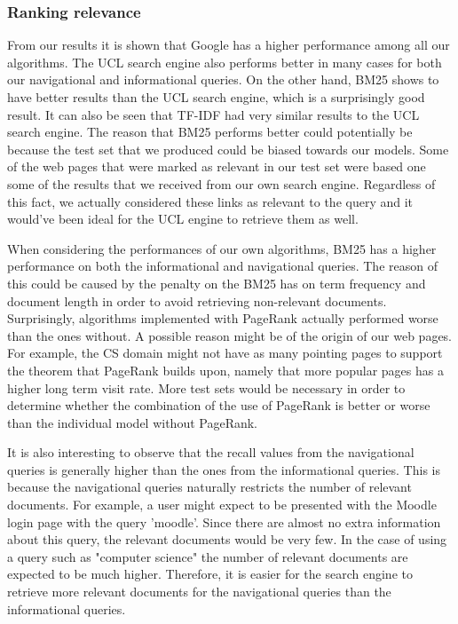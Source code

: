 \subsubsection{Ranking relevance}
From our results it is shown that Google has a higher performance among all our algorithms. The UCL search engine also performs better in many cases for both our navigational and informational queries. On the other hand, BM25 shows to have better results than the UCL search engine, which is a surprisingly good result. It can also be seen that TF-IDF had very similar results to the UCL search engine. The reason that BM25 performs better could potentially be because the test set that we produced could be biased towards our models. Some of the web pages that were marked as relevant in our test set were based one some of the results that we received from our own search engine. Regardless of this fact, we actually considered these links as relevant to the query and it would've been ideal for the UCL engine to retrieve them as well. 

When considering the performances of our own algorithms, BM25 has a higher performance on both the informational and navigational queries. The reason of this could be caused by the penalty on the BM25 has on term frequency and document length in order to avoid retrieving non-relevant documents. Surprisingly, algorithms implemented with PageRank actually performed worse than the ones without. A possible reason might be of the origin of our web pages. For example, the CS domain might not have as many pointing pages to support the theorem that PageRank builds upon, namely that more popular pages has a higher long term visit rate. More test sets would be necessary in order to determine whether the combination of the use of PageRank is better or worse than the individual model without PageRank. 

It is also interesting to observe that the recall values from the navigational queries is generally higher than the ones from the informational queries. This is because the navigational queries naturally restricts the number of relevant documents. For example, a user might expect to be presented with the Moodle login page with the query 'moodle'. Since there are almost no extra information about this query, the relevant documents would be very few. In the case of using a query such as "computer science" the number of relevant documents are expected to be much higher. Therefore, it is easier for the search engine to retrieve more relevant documents for the navigational queries than the informational queries.

